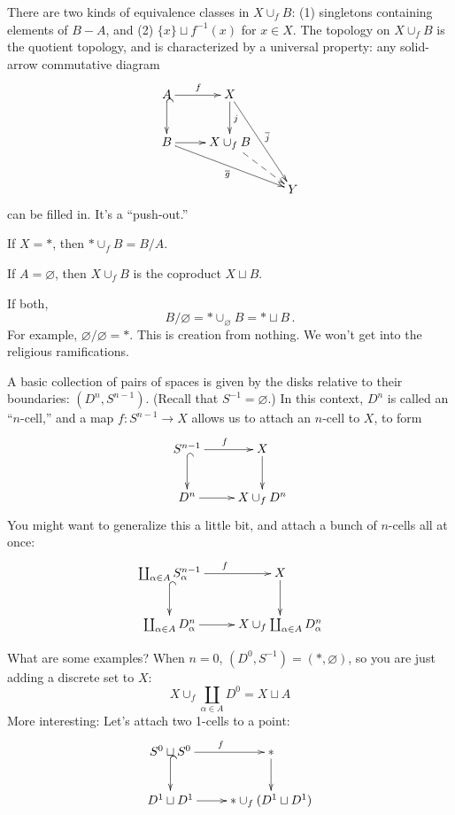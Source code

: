 There are two kinds of equivalence classes in $X\cup_fB$: (1) singletons containing elements of $B-A$, and (2) $\{x\}\sqcup f^{-1}(x)$ for $x\in X$.
The topology on $X\cup_fB$ is the quotient topology, and is characterized
by a universal property: any solid-arrow commutative diagram
\begin{equation*}
\xymatrix{A\ar[r]^f\ar@{^(->}[d] & X\ar[d]^j\ar[ddr]^{\overline{j}} & \\
B\ar[r]\ar[drr]_{\overline{g}} & X\cup_f B\ar@{-->}[dr] & \\
 & & Y}
\end{equation*}
can be filled in. It's a ``push-out.''
\begin{example}
If $X=\ast$, then $\ast\cup_f B=B/A$.
\end{example}
\begin{example}
If $A=\varnothing$, then $X\cup_fB$ is the coproduct $X\sqcup B$. 
\end{example}
\begin{example}
If both, 
\[
B/\varnothing=\ast\cup_\varnothing B=\ast\sqcup B\,.
\]
For example, $\varnothing/\varnothing=\ast$. 
This is creation from nothing. We won't get into the religious ramifications.
\end{example}
\begin{example}
A basic collection of pairs of spaces is given by the disks relative to their
boundaries: $(D^n,S^{n-1})$. (Recall that $S^{-1}=\varnothing$.) In this
context, $D^n$ is called an ``$n$-cell,'' and a map $f:S^{n-1}\to X$ allows
us to attach an $n$-cell to $X$, to form 
\begin{equation*}
\xymatrix{S^{n-1}\ar[r]^f\ar@{^(->}[d] & X\ar[d]\\
D^n\ar[r] & X\cup_f D^n}
\end{equation*}
You might want to generalize this a little bit, and attach a bunch of $n$-cells all at once:
\begin{equation*}
\xymatrix{\coprod_{\alpha\in A}S^{n-1}_\alpha\ar[r]^f\ar@{^(->}[d] & X\ar[d]\\
\coprod_{\alpha\in A}D^n_\alpha\ar[r] & X\cup_f \coprod_{\alpha\in A}D^n_\alpha}
\end{equation*}
\end{example}
What are some examples? When $n=0$, $(D^0,S^{-1})=(\ast,\varnothing)$, so 
you are just adding a discrete set to $X$:
\[
X\cup_f\coprod_{\alpha\in A}D^0=X\sqcup A
\]
More interesting: Let's attach two 1-cells to a point:
\begin{equation*}
\xymatrix{S^0\sqcup S^0\ar[r]^f\ar@{^(->}[d] & \ast\ar[d]\\
D^1\sqcup D^1\ar[r] & \ast\cup_f (D^1\sqcup D^1)}
\end{equation*}
